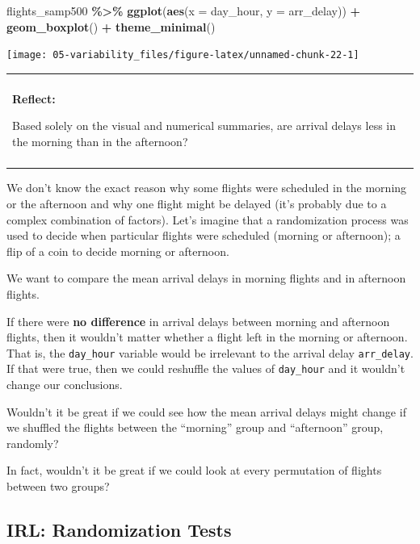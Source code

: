 \documentclass[
]{book}
\newenvironment{Shaded}{\begin{snugshade}}{\end{snugshade}}
\newcommand{\AttributeTok}[1]{\textcolor[rgb]{0.13,0.29,0.53}{#1}}
\newcommand{\FunctionTok}[1]{\textcolor[rgb]{0.13,0.29,0.53}{\textbf{#1}}}
\newcommand{\NormalTok}[1]{#1}
\newcommand{\SpecialCharTok}[1]{\textcolor[rgb]{0.81,0.36,0.00}{\textbf{#1}}}
\newenvironment{reflect}
{
    \begin{center}
    
    \begin{tabular}{|p{0.8\textwidth}|}
    \rowcolor{LightBlue}
    \hline\\
    \rowcolor{LightBlue}
    \textbf{Reflect:}
}
{
    \\\rowcolor{LightBlue}
    \\\hline
    \end{tabular} 
    \end{center}
}
\begin{document}
\begin{Shaded}
\begin{Highlighting}[]
\NormalTok{flights\_samp500 }\SpecialCharTok{\%\textgreater{}\%}
    \FunctionTok{ggplot}\NormalTok{(}\FunctionTok{aes}\NormalTok{(}\AttributeTok{x =}\NormalTok{ day\_hour, }\AttributeTok{y =}\NormalTok{ arr\_delay)) }\SpecialCharTok{+}
    \FunctionTok{geom\_boxplot}\NormalTok{() }\SpecialCharTok{+}
    \FunctionTok{theme\_minimal}\NormalTok{()}
\end{Highlighting}
\end{Shaded}

\begin{center}\texttt{[image: 05-variability\_files/figure-latex/unnamed-chunk-22-1]} \end{center}

\begin{reflect}
Based solely on the visual and numerical summaries, are arrival delays
less in the morning than in the afternoon?
\end{reflect}

We don't know the exact reason why some flights were scheduled in the morning or the afternoon and why one flight might be delayed (it's probably due to a complex combination of factors). Let's imagine that a randomization process was used to decide when particular flights were scheduled (morning or afternoon); a flip of a coin to decide morning or afternoon.

We want to compare the mean arrival delays in morning flights and in afternoon flights.

If there were \textbf{no difference} in arrival delays between morning and afternoon flights, then it wouldn't matter whether a flight left in the morning or afternoon. That is, the \texttt{day\_hour} variable would be irrelevant to the arrival delay \texttt{arr\_delay}. If that were true, then we could reshuffle the values of \texttt{day\_hour} and it wouldn't change our conclusions.

Wouldn't it be great if we could see how the mean arrival delays might change if we shuffled the flights between the ``morning'' group and ``afternoon'' group, randomly?

In fact, wouldn't it be great if we could look at every permutation of flights between two groups?

\subsection{IRL: Randomization Tests}\label{irl-randomization-tests}
\end{document}
